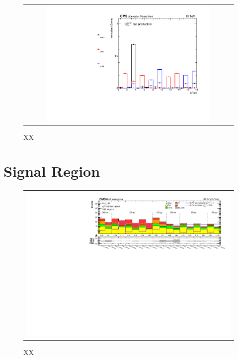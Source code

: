  \begin{figure}[tbh!]
 \begin{center}
 \begin{tabular}{c}
 \includegraphics[width=0.8\textwidth]{figures/Part4/Evt/SRbin}
 \end{tabular}
 \caption{XX}
 \label{fig:SRbin}
 \end{center}
 \end{figure}

\section{Signal Region}
\label{sec:SRInclusive}

\begin{figure}[tbh!]
 \begin{center}
 \begin{tabular}{c}
 \includegraphics[width=\textwidth]{figures/Part4/Evt/Summary_llOffZMetg20B1}
 \end{tabular}
 \caption{XX}
 \label{fig:Summary}
 \end{center}
 \end{figure}
 
